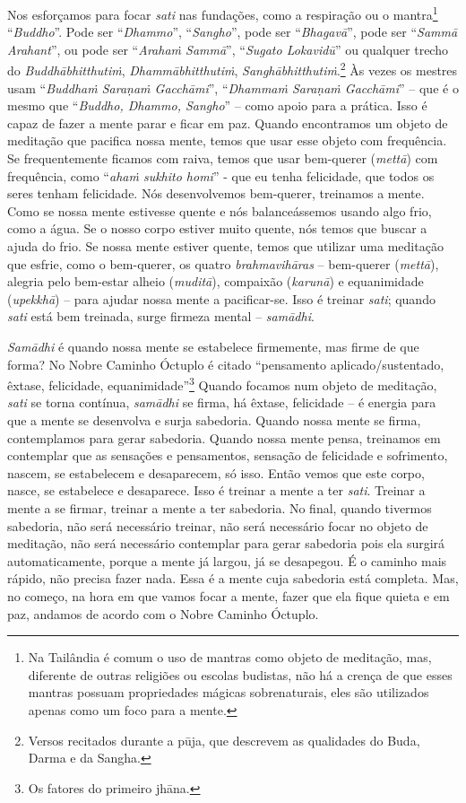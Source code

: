 Nos esforçamos para focar \emph{sati} nas fundações, como a
respiração ou o mantra\footnote{Na Tailândia é comum o uso de mantras
como objeto de meditação, mas, diferente de outras religiões ou escolas
budistas, não há a crença de que esses mantras possuam propriedades
mágicas sobrenaturais, eles são utilizados apenas como um foco para a
mente.} “\emph{Buddho}”. Pode ser “\emph{Dhammo}”,
“\emph{Sangho}”, pode ser “\emph{Bhagavā}”, pode ser
“\emph{Sammā Arahant}”, ou pode ser “\emph{Arahaṁ Sammā}”,
“\emph{Sugato Lokavidū}” ou qualquer trecho do
\emph{Buddhābhitthutiṁ}, \emph{Dhammābhitthutiṁ},
\emph{Sanghābhitthutiṁ}.\footnote{Versos recitados durante a pūja,
que descrevem as qualidades do Buda, Darma e da Sangha.} Às vezes os
mestres usam “\emph{Buddhaṁ Saraṇaṁ Gacchāmi}”, “\emph{Dhammaṁ
Saraṇaṁ Gacchāmi}” – que é o mesmo que “\emph{Buddho, Dhammo,
Sangho}” – como apoio para a prática. Isso é capaz de fazer a mente
parar e ficar em paz. Quando encontramos um objeto de meditação que
pacifica nossa mente, temos que usar esse objeto com frequência. Se
frequentemente ficamos com raiva, temos que usar bem-querer
(\emph{mettā}) com frequência, como “\emph{ahaṁ sukhito homi}” -
que eu tenha felicidade, que todos os seres tenham felicidade. Nós
desenvolvemos bem-querer, treinamos a mente. Como se nossa mente
estivesse quente e nós balanceássemos usando algo frio, como a água. Se
o nosso corpo estiver muito quente, nós temos que buscar a ajuda do
frio. Se nossa mente estiver quente, temos que utilizar uma meditação
que esfrie, como o bem-querer, os quatro \emph{brahmavihāras} –
bem-querer (\emph{mettā}), alegria pelo bem-estar alheio
(\emph{muditā}), compaixão (\emph{karunā}) e equanimidade
(\emph{upekkhā}) – para ajudar nossa mente a pacificar-se.
Isso é treinar \emph{sati}; quando \emph{sati} está bem treinada,
surge firmeza mental – \emph{samādhi}. 

\emph{Samādhi} é quando nossa mente se estabelece firmemente,
mas firme de que forma? No Nobre Caminho Óctuplo é citado “pensamento
aplicado/sustentado, êxtase, felicidade, equanimidade”\footnote{Os
fatores do primeiro jhāna.} Quando focamos num objeto de meditação,
\emph{sati} se torna contínua, \emph{samādhi} se firma, há
êxtase, felicidade – é energia para que a mente se desenvolva e surja
sabedoria. Quando nossa mente se firma, contemplamos para gerar
sabedoria. Quando nossa mente pensa, treinamos em contemplar que as
sensações e pensamentos, sensação de felicidade e sofrimento, nascem,
se estabelecem e desaparecem, só isso. Então vemos que este corpo,
nasce, se estabelece e desaparece. Isso é treinar a mente a ter
\emph{sati}. Treinar a mente a se firmar, treinar a mente a ter
sabedoria. No final, quando tivermos sabedoria, não será necessário
treinar, não será necessário focar no objeto de meditação, não será
necessário contemplar para gerar sabedoria pois ela surgirá
automaticamente, porque a mente já largou, já se desapegou. É o caminho
mais rápido, não precisa fazer nada. Essa é a mente cuja sabedoria está
completa. Mas, no começo, na hora em que vamos focar a mente, fazer que
ela fique quieta e em paz, andamos de acordo com o Nobre Caminho
Óctuplo. 

